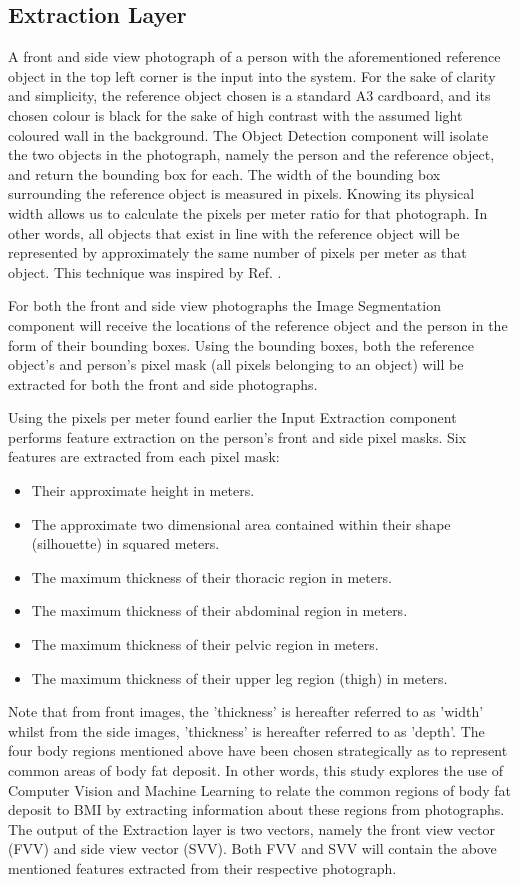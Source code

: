 \documentclass[conference]{IEEEtran}
\begin{document}
\subsection{Extraction Layer}
A front and side view photograph of a person with the aforementioned reference object in the top left corner is the input into the system.
For the sake of clarity and simplicity, the reference object chosen is a standard A3 cardboard, and its chosen colour is black for the sake of high contrast with the assumed light coloured wall in the background.
The Object Detection component will isolate the two objects in the photograph, namely the person and the reference object, and return the bounding box for each.
The width of the bounding box surrounding the reference object is measured in pixels.
Knowing its physical width allows us to calculate the pixels per meter ratio for that photograph.
In other words, all objects that exist in line with the reference object will be represented by approximately the same number of pixels per meter as that object.
This technique was inspired by Ref. \cite{objectDetection}.

For both the front and side view photographs the Image Segmentation component will receive the locations of the reference object and the person in the form of their bounding boxes.
Using the bounding boxes, both the reference object's and person's pixel mask (all pixels belonging to an object) will be extracted for both the front and side photographs.

Using the pixels per meter found earlier the Input Extraction component performs feature extraction on the person's front and side pixel masks.
Six features are extracted from each pixel mask:
\begin{itemize}
	\item Their approximate height in meters.
	\item The approximate two dimensional area contained within their shape (silhouette) in squared meters.
	\item The maximum thickness of their thoracic region in meters.
	\item The maximum thickness of their abdominal region in meters.
	\item The maximum thickness of their pelvic region in meters.
	\item The maximum thickness of their upper leg region (thigh) in meters.	
\end{itemize}
Note that from front images, the 'thickness' is hereafter referred to as 'width' whilst from the side images, 'thickness' is hereafter referred to as 'depth'.
The four body regions mentioned above have been chosen strategically as to represent common areas of body fat deposit. %
In other words, this study explores the use of Computer Vision and Machine Learning to relate the common regions of body fat deposit to BMI by extracting information about these regions from photographs.
The output of the Extraction layer is two vectors, namely the front view vector (FVV) and side view vector (SVV).
Both FVV and SVV will contain the above mentioned features extracted from their respective photograph.
\end{document}
